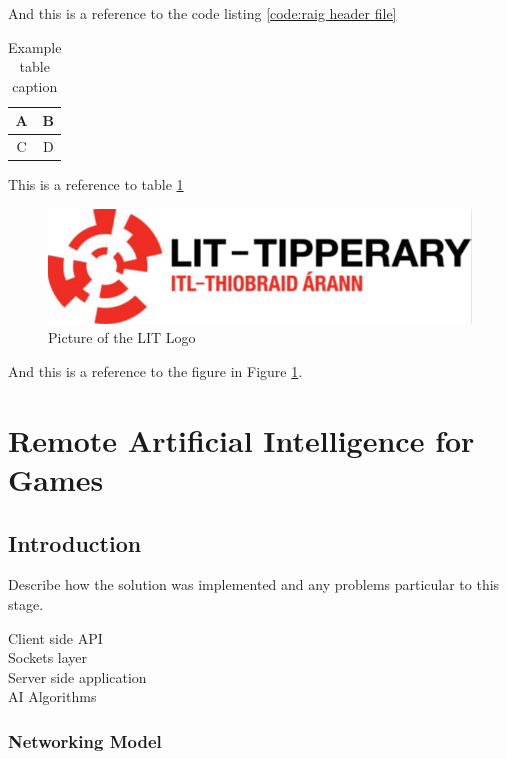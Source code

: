 \documentclass[12pt,a4paper,titlepage]{article}
\begin{document}
And this is a reference to the code listing \ref{code:raig header file}


\begin{table}[H] %
\begin{center}

\begin{tabular}{ | c | c |}
\hline
A & B \\ 
\hline
C & D \\
\hline
\end{tabular}
\caption{Example table caption}
\label{table:x Example table}
\end{center}
\end{table}

This is a reference to table \ref{table:x Example table}

\begin{figure}[H]
	\centering
    	\includegraphics[width=\textwidth]{Figures/lit_logo}
	\caption{Picture of the LIT Logo}
	\label{fig:example figure and caption}
\end{figure}

And this is a reference to the figure in Figure \ref{fig:example figure and caption}.


\section{Remote Artificial Intelligence for Games}

\subsection{Introduction}

Describe how the solution was implemented and any problems particular to this stage.

Client side API\\
Sockets layer\\
Server side application\\
AI Algorithms\\

\subsubsection{Networking Model}
\end{document}
